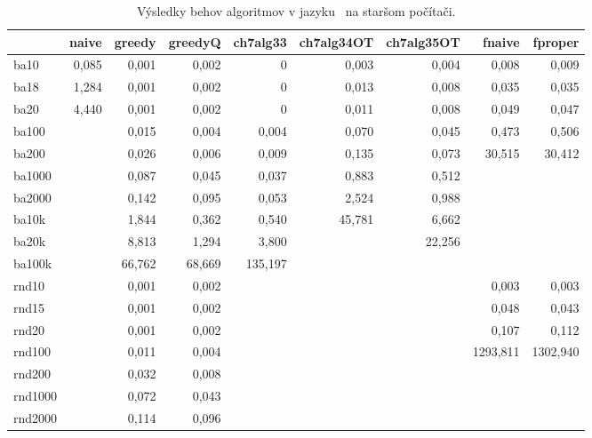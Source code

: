 \begin{table}[h]
	\centering
	\caption{Výsledky behov algoritmov v jazyku \Java\ na staršom počítači.}
	\begin{tabular}{l|rrrrrrrr}
		\hline
		& naive & greedy & greedyQ & ch7alg33 & ch7alg34OT & ch7alg35OT & fnaive   & fproper \\ \hline
		ba10    & 0,085 & 0,001  & 0,002   & 0        & 0,003      & 0,004      & 0,008    & 0,009   \\
		ba18    & 1,284 & 0,001  & 0,002   & 0        & 0,013      & 0,008      & 0,035    & 0,035   \\
		ba20    & 4,440 & 0,001  & 0,002   & 0        & 0,011      & 0,008      & 0,049    & 0,047   \\
		ba100   &       & 0,015  & 0,004   & 0,004    & 0,070      & 0,045      & 0,473    & 0,506   \\
		ba200   &       & 0,026  & 0,006   & 0,009    & 0,135      & 0,073      & 30,515   & 30,412  \\
		ba1000  &       & 0,087  & 0,045   & 0,037    & 0,883      & 0,512      &          &         \\
		ba2000  &       & 0,142  & 0,095   & 0,053    & 2,524      & 0,988      &          &         \\
		ba10k   &       & 1,844  & 0,362   & 0,540    & 45,781     & 6,662      &          &         \\
		ba20k   &       & 8,813  & 1,294   & 3,800    &            & 22,256     &          &         \\
		ba100k  &       & 66,762 & 68,669  & 135,197  &            &            &          &         \\
		rnd10   &       & 0,001  & 0,002   &          &            &            & 0,003    & 0,003   \\
		rnd15   &       & 0,001  & 0,002   &          &            &            & 0,048    & 0,043   \\
		rnd20   &       & 0,001  & 0,002   &          &            &            & 0,107    & 0,112   \\
		rnd100  &       & 0,011  & 0,004   &          &            &            & 1293,811 & 1302,940\\
		rnd200  &       & 0,032  & 0,008   &          &            &            &          &         \\
		rnd1000 &       & 0,072  & 0,043   &          &            &            &          &         \\
		rnd2000 &       & 0,114  & 0,096   &          &            &            &          &         \\

\end{tabular}
\end{table}
